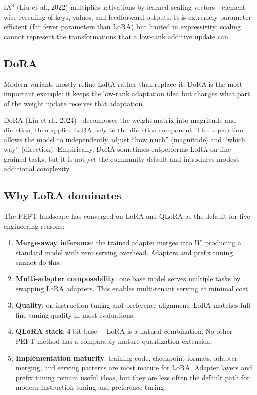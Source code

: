 IA$^3$ (Liu et al., 2022) multiplies activations by learned scaling vectors---element-wise rescaling of keys, values, and feedforward outputs. It is extremely parameter-efficient (far fewer parameters than LoRA) but limited in expressivity: scaling cannot represent the transformations that a low-rank additive update can.

\subsection{DoRA}

Modern variants mostly refine LoRA rather than replace it. DoRA is the most important example: it keeps the low-rank adaptation idea but changes what part of the weight update receives that adaptation.

DoRA (Liu et al., 2024)~\cite{liu2024dora} decomposes the weight matrix into magnitude and direction, then applies LoRA only to the direction component. This separation allows the model to independently adjust ``how much'' (magnitude) and ``which way'' (direction). Empirically, DoRA sometimes outperforms LoRA on fine-grained tasks, but it is not yet the community default and introduces modest additional complexity.

\subsection{Why LoRA dominates}

The PEFT landscape has converged on LoRA and QLoRA as the default for five engineering reasons:

\begin{enumerate}[nosep]
  \item \textbf{Merge-away inference}: the trained adapter merges into $W$, producing a standard model with zero serving overhead. Adapters and prefix tuning cannot do this.
  \item \textbf{Multi-adapter composability}: one base model serves multiple tasks by swapping LoRA adapters. This enables multi-tenant serving at minimal cost.
  \item \textbf{Quality}: on instruction tuning and preference alignment, LoRA matches full fine-tuning quality in most evaluations.
  \item \textbf{QLoRA stack}: 4-bit base + LoRA is a natural combination. No other PEFT method has a comparably mature quantization extension.
  \item \textbf{Implementation maturity}: training code, checkpoint formats, adapter merging, and serving patterns are most mature for LoRA. Adapter layers and prefix tuning remain useful ideas, but they are less often the default path for modern instruction tuning and preference tuning.
\end{enumerate}

